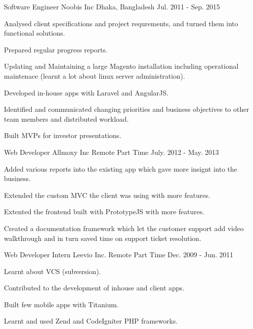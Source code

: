 \begin{cventries}
  \cventry
    {Software Engineer} %
    {Noobis Inc} %
    {Dhaka, Bangladesh} %
    {Jul. 2011 - Sep. 2015} %
    {
      \begin{cvitems} %
        \item {Analysed client specifications and project requrements, and turned them into functional solutions.}
        \item {Prepared regular progress reports.}
        \item {Updating and Maintaining a large Magento installation including operational maintenace (learnt a lot about linux server administration).}
        \item {Developed in-house apps with Laravel and AngularJS.}
        \item {Identified and communicated changing priorities and business objectives to other team members and distributed workload.}
        \item {Built MVPs for investor presentations.}
      \end{cvitems}
    }
  \cventry
    {Web Developer} %
    {Allmoxy Inc} %
    {Remote Part Time} %
    {July. 2012 - May. 2013} %
    {
      \begin{cvitems} %
        \item {Added various reports into the existing app which gave more insignt into the business.}
        \item {Extended the custom MVC the client was using with more features.}
        \item {Extented the frontend built with PrototypeJS with more features.}
        \item {Created a documentation framework which let the customer support add video walkthrough and in turn saved time on support ticket resolution.}
      \end{cvitems}
    }

  \cventry
    {Web Developer Intern} %
    {Leevio Inc.} %
    {Remote Part Time} %
    {Dec. 2009 - Jun. 2011 } %
    {
      \begin{cvitems} %
      \item {Learnt about VCS (subversion).}
      \item {Contributed to the development of inhouse and client apps.}
      \item {Built few mobile apps with Titanium.}
      \item {Learnt and used Zend and CodeIgniter PHP frameworks.}
      \end{cvitems}
    }
\end{cventries}
